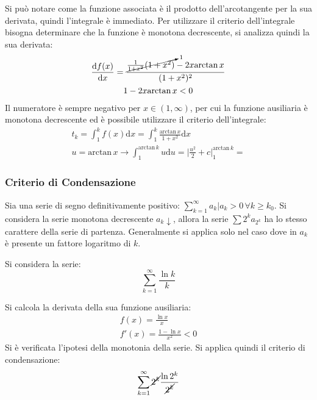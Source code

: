 \documentclass{article}
\numberwithin{equation}{subsection}
\begin{document}
Si può notare come la funzione associata è il prodotto dell'arcotangente per la sua derivata, quindi l'integrale è immediato. Per utilizzare il criterio dell'integrale bisogna determinare che la funzione è monotona decrescente, si analizza quindi la sua derivata:
\begin{gather*}
    \displaystyle\frac{\mathrm{d}f(x)}{\mathrm{d}x}=\displaystyle\frac{\cancelto{1}{\frac{1}{1+x^2}(1+x^2)}-2x\text{arctan}\,x}{(1+x^2)^2}\\
    1-2x\text{arctan}\,x <0
\end{gather*}
Il numeratore è sempre negativo per $x\in(1,\infty)$, per cui la funzione ausiliaria è monotona decrescente ed è possibile utilizzare il criterio dell'integrale:
\begin{gather*}
    t_k=\displaystyle\int_{1}^kf(x)\mathrm{d}x=\int_1^k\frac{\text{arctan}\,x}{1+x^2}\mathrm{d}x\\
    u=\text{arctan}\,x\rightarrow\int_1^{\text{arctan}\,k}u \mathrm{d}u=\bigg|\frac{u^2}{2}+c\bigg|_1^{\text{arctan}\,k}= %
\end{gather*}

\subsubsection{Criterio di Condensazione}

Sia una serie di segno definitivamente positivo: $\sum_{k=1}^\infty a_k | a_k>0\,\forall k\geq k_0$. Si considera la serie monotona decrescente $a_k\downarrow$, allora la serie $\sum 2^ka_{2^k}$ ha lo stesso carattere della serie di partenza. Generalmente si applica solo nel caso dove in $a_k$ è presente un fattore logaritmo di $k$. 

Si considera la serie:
\begin{equation*}
    \displaystyle\sum_{k=1}^\infty\frac{\ln k}{k}
\end{equation*}

Si calcola la derivata della sua funzione ausiliaria:
\begin{gather*}
    \displaystyle f(x)=\frac{\ln x}{x}\\
    f'(x)=\displaystyle\frac{1-\ln x}{x^2}<0
\end{gather*}
Si è verificata l'ipotesi della monotonia della serie. 
Si applica quindi il criterio di condensazione:
\begin{gather*}
    \displaystyle\sum_{k=1}^\infty \cancel{2^k}\frac{\ln 2^k}{\cancel{2^k}}
\end{gather*}
\end{document}
